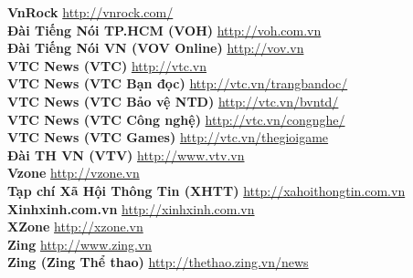 \textbf{VnRock}  \hspace{0.5in} \href{http://vnrock.com/}{http://vnrock.com/} \\ 
\textbf{Đài Tiếng Nói TP.HCM (VOH)}  \hspace{0.5in} \href{http://voh.com.vn}{http://voh.com.vn} \\ 
\textbf{Đài Tiếng Nói VN (VOV Online)}  \hspace{0.5in} \href{http://vov.vn}{http://vov.vn} \\ 
\textbf{VTC News (VTC)}  \hspace{0.5in} \href{http://vtc.vn}{http://vtc.vn} \\ 
\textbf{VTC News (VTC Bạn đọc)} \hspace{0.5in} \href{http://vtc.vn/trangbandoc/}{http://vtc.vn/trangbandoc/} \\ 
\textbf{VTC News (VTC Bảo vệ NTD)} \hspace{0.5in} \href{http://vtc.vn/bvntd/}{http://vtc.vn/bvntd/} \\ 
\textbf{VTC News (VTC Công nghệ)} \hspace{0.5in} \href{http://vtc.vn/congnghe/}{http://vtc.vn/congnghe/} \\ 
\textbf{VTC News (VTC Games)}  \hspace{0.5in} \href{http://vtc.vn/thegioigame}{http://vtc.vn/thegioigame} \\ 
\textbf{Đài TH VN (VTV)}  \hspace{0.5in} \href{http://www.vtv.vn}{http://www.vtv.vn} \\ 
\textbf{Vzone}  \hspace{0.5in} \href{http://vzone.vn}{http://vzone.vn} \\ 
\textbf{Tạp chí Xã Hội Thông Tin (XHTT)}  \hspace{0.5in} \href{http://xahoithongtin.com.vn}{http://xahoithongtin.com.vn} \\ 
\textbf{Xinhxinh.com.vn}  \hspace{0.5in} \href{http://xinhxinh.com.vn}{http://xinhxinh.com.vn} \\ 
\textbf{XZone}  \hspace{0.5in} \href{http://xzone.vn}{http://xzone.vn} \\ 
\textbf{Zing}  \hspace{0.5in} \href{http://www.zing.vn}{http://www.zing.vn} \\ 
\textbf{Zing (Zing Thể thao)} \hspace{0.5in} \href{http://thethao.zing.vn/news}{http://thethao.zing.vn/news}




